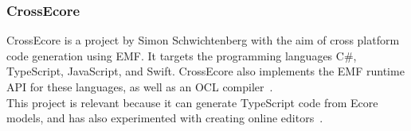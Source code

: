 \subsubsection{CrossEcore}
CrossEcore is a project by Simon Schwichtenberg with the aim of cross platform code generation using \acrshort{EMF}.
It targets the programming languages C\#, TypeScript, JavaScript, and Swift.
CrossEcore also implements the \acrshort{EMF} runtime \acrshort{API} for these languages, as well as an \gls{OCL} compiler~\cite{simonschwichtenbergCrossecoreEcoretypescript2021}.\\

This project is relevant because it can generate TypeScript code from \gls{Ecore} models, and has also experimented with creating online editors~\cite{simonschwichtenbergCrossEcore}.

